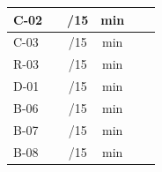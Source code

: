 \begin{center}
\begin{tabular}{|l|c|c|c|c|c|}
\hline
C-02 & \underline{\hspace{1.5cm}} & \underline{\hspace{1cm}}/15 & \underline{\hspace{1cm}}min & \underline{\hspace{1cm}} & \underline{\hspace{2cm}} \\
\hline
C-03 & \underline{\hspace{1.5cm}} & \underline{\hspace{1cm}}/15 & \underline{\hspace{1cm}}min & \underline{\hspace{1cm}} & \underline{\hspace{2cm}} \\
\hline
R-03 & \underline{\hspace{1.5cm}} & \underline{\hspace{1cm}}/15 & \underline{\hspace{1cm}}min & \underline{\hspace{1cm}} & \underline{\hspace{2cm}} \\
\hline
D-01 & \underline{\hspace{1.5cm}} & \underline{\hspace{1cm}}/15 & \underline{\hspace{1cm}}min & \underline{\hspace{1cm}} & \underline{\hspace{2cm}} \\
\hline
B-06 & \underline{\hspace{1.5cm}} & \underline{\hspace{1cm}}/15 & \underline{\hspace{1cm}}min & \underline{\hspace{1cm}} & \underline{\hspace{2cm}} \\
\hline
B-07 & \underline{\hspace{1.5cm}} & \underline{\hspace{1cm}}/15 & \underline{\hspace{1cm}}min & \underline{\hspace{1cm}} & \underline{\hspace{2cm}} \\
\hline
B-08 & \underline{\hspace{1.5cm}} & \underline{\hspace{1cm}}/15 & \underline{\hspace{1cm}}min & \underline{\hspace{1cm}} & \underline{\hspace{2cm}} \\

\end{tabular}
\end{center}
